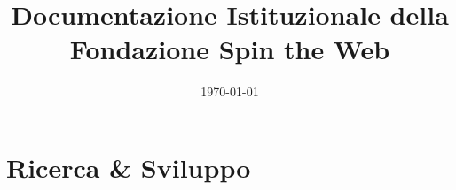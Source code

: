 \documentclass[11pt,a4paper]{article}
\title{Documentazione Istituzionale della Fondazione Spin the Web}
\author{}
\date{\today}
\begin{document}
\maketitle
\tableofcontents






\section{Ricerca \& Sviluppo}

\end{document}
